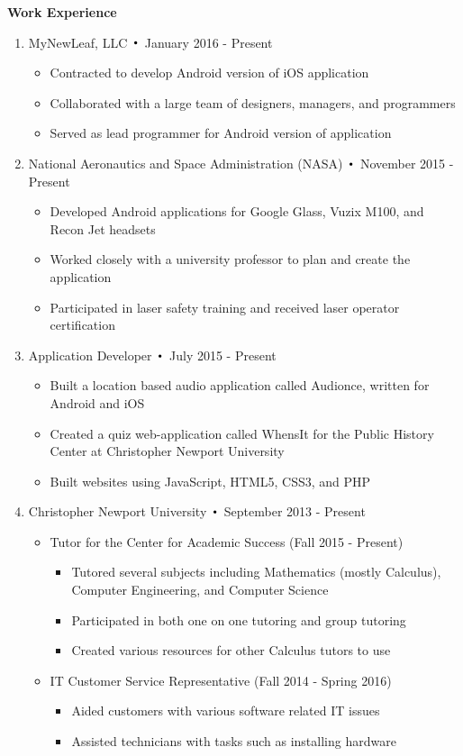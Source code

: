 \noindent\textbf{\large Work Experience}
\begin{enumerate}[label={\Roman*}.]

\item MyNewLeaf, LLC $\Bigcdot$ January 2016 - Present
\begin{itemize}
\item Contracted to develop Android version of iOS application
\item Collaborated with a large team of designers, managers, and programmers
\item Served as lead programmer for Android version of application
\end{itemize}

\item National Aeronautics and Space Administration (NASA) $\Bigcdot$ November 2015 - Present
\begin{itemize}
\item Developed Android applications for Google Glass, Vuzix M100, and Recon Jet headsets
\item Worked closely with a university professor to plan and create the application
\item Participated in laser safety training and received laser operator certification

\end{itemize}

\item Application Developer $\Bigcdot$ July 2015 - Present
\begin{itemize}
\item Built a location based audio application called Audionce, written for Android and iOS
\item Created a quiz web-application called WhensIt for the Public History Center at Christopher Newport
University
\item Built websites using JavaScript, HTML5, CSS3, and PHP
\end{itemize}

\item Christopher Newport University $\Bigcdot$ September 2013 - Present
\begin{itemize}
\item Tutor for the Center for Academic Success (Fall 2015 - Present)
\begin{itemize}
\item Tutored several subjects including Mathematics (mostly Calculus), Computer Engineering, and
Computer Science
\item Participated in both one on one tutoring and group tutoring
\item Created various resources for other Calculus tutors to use
\end{itemize}
\item IT Customer Service Representative (Fall 2014 - Spring 2016)
\begin{itemize}
\item Aided customers with various software related IT issues
\item Assisted technicians with tasks such as installing hardware
\end{itemize}
\end{itemize}


\end{enumerate}
